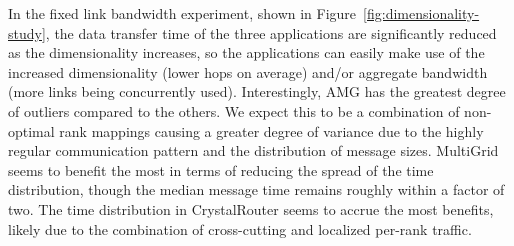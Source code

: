 \documentclass[conference]{IEEEtran}
\begin{document}
In the fixed link bandwidth experiment, shown in Figure~\ref{fig:dimensionality-study}, the data transfer time of the three applications are significantly reduced as the dimensionality increases, so the applications can easily make use of the increased dimensionality (lower hops on average) and/or aggregate bandwidth (more links being concurrently used). Interestingly, AMG has the greatest degree of outliers compared to the others. We expect this to be a combination of non-optimal rank mappings causing a greater degree of variance due to the highly regular communication pattern and the distribution of message sizes. MultiGrid seems to benefit the most in terms of reducing the spread of the time distribution, though the median message time remains roughly within a factor of two. The time distribution in CrystalRouter seems to accrue the most benefits, likely due to the combination of cross-cutting and localized per-rank traffic.
\end{document}
